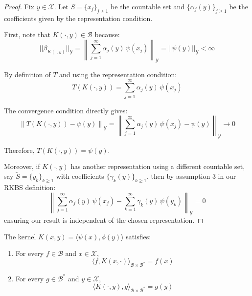 \begin{proof}
Fix $y \in \mathcal{X}$. Let $S = \{x_j\}_{j\ge1}$ be the countable set and $\{\alpha_j(y)\}_{j\ge1}$ be the coefficients given by the representation condition.

First, note that $K(\cdot,y) \in \mathcal{B}$ because:
\begin{equation}
||\beta_{K(\cdot,y)}||_{\mathcal{Y}} = \left\|\sum_{j=1}^\infty \alpha_j(y)\, \psi(x_j)\right\|_{\mathcal{Y}} = ||\psi(y)||_{\mathcal{Y}} < \infty
\end{equation}

By definition of $T$ and using the representation condition:
\begin{equation}
T(K(\cdot,y)) = \sum_{j=1}^\infty \alpha_j(y)\, \psi(x_j)
\end{equation}

The convergence condition directly gives:
\begin{equation}
\left\|T(K(\cdot,y)) - \psi(y)\right\|_{\mathcal{Y}} = \left\|\sum_{j=1}^\infty \alpha_j(y)\, \psi(x_j) - \psi(y)\right\|_{\mathcal{Y}} \to 0
\end{equation}

Therefore, $T(K(\cdot,y)) = \psi(y)$.

Moreover, if $K(\cdot,y)$ has another representation using a different countable set, say $\tilde{S} = \{y_k\}_{k\ge1}$ with coefficients $\{\gamma_k(y)\}_{k\ge1}$, then by assumption 3 in our RKBS definition:
\begin{equation}
\left\|\sum_{j=1}^\infty \alpha_j(y)\, \psi(x_j) - \sum_{k=1}^\infty \gamma_k(y)\, \psi(y_k)\right\|_{\mathcal{Y}} = 0
\end{equation}
ensuring our result is independent of the chosen representation.
\end{proof}

\begin{theorem}
The kernel $K(x,y)=\langle \psi(x), \phi(y)\rangle$ satisfies:
\begin{enumerate}
\item For every $f\in\mathcal{B}$ and $x\in\mathcal{X}$,
\begin{equation}
\langle f, K(x,\cdot) \rangle_{\mathcal{B}\times \mathcal{B}^*} = f(x)
\end{equation}

\item For every $g\in\mathcal{B}^*$ and $y\in\mathcal{X}$,
\begin{equation}
\langle K(\cdot,y), g \rangle_{\mathcal{B}\times \mathcal{B}^*} = g(y)
\end{equation}
\end{enumerate}
\end{theorem}

